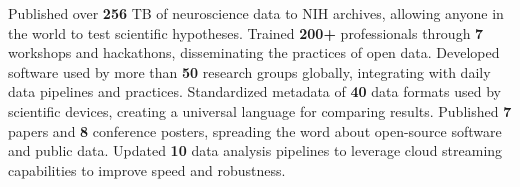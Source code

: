 \begin{rubric}{}
%
\entry*[Data]
    Published over \textbf{256} TB of neuroscience data to NIH archives, allowing anyone in the world to test scientific hypotheses.
%
\entry*[Education]
    Trained \textbf{200+} professionals through \textbf{7} workshops and hackathons, disseminating the practices of
open data.
%
\entry*[Software]
    Developed software used by more than \textbf{50} research groups globally, integrating with daily data pipelines and practices.
%
\entry*[Standardization]
    Standardized metadata of \textbf{40} data formats used by scientific devices, creating a universal language for comparing results.
%
\entry*[Publications]
    Published \textbf{7} papers and \textbf{8} conference posters, spreading the word about open-source software and public data.
%
\entry*[Pipelines]
    Updated \textbf{10} data analysis pipelines to leverage cloud streaming capabilities to improve speed and robustness.
%
\end{rubric}
